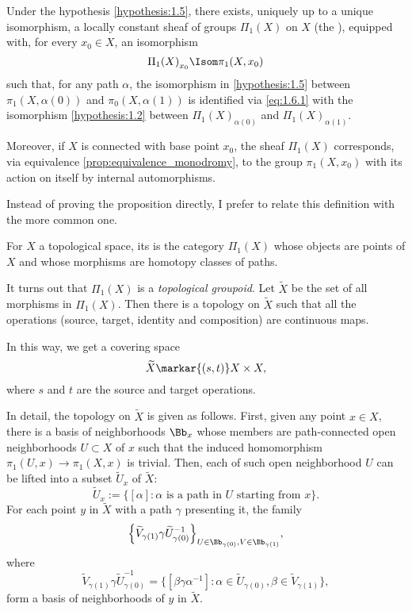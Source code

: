 \begin{proposition}\label{prop:fundamental_groupoid}
  Under the hypothesis \ref{hypothesis:1.5}, there exists,
  uniquely up to a unique isomorphism, a locally constant sheaf of groups
  $\Pi_1(X)$ on $X$ (the ), equipped with,
  for every $x_0\in X$, an isomorphism
  \begin{equation}\label{eq:1.6.1}
    {\Pi_1(X)}_{x_0}\Isom\pi_1(X,x_0)
  \end{equation}
  such that, for any path $\alpha$,
  the isomorphism in \ref{hypothesis:1.5}
  between $\pi_1(X,\alpha(0))$ and $\pi_0(X,\alpha(1))$ is
  identified via \cref{eq:1.6.1} with
  the isomorphism \ref{hypothesis:1.2} between
  ${\Pi_1(X)}_{\alpha(0)}$ and ${\Pi_1(X)}_{\alpha(1)}$.

  Moreover, if $X$ is connected with base point $x_0$, the sheaf $\Pi_1(X)$
  corresponds, via equivalence \ref{prop:equivalence_monodromy},
  to the group $\pi_1(X,x_0)$
  with its action on itself by internal automorphisms.
\end{proposition}


Instead of proving the proposition directly, I prefer to relate this definition
with the more common one.

\begin{subpara}
  For $X$ a topological space, its  is the category
  $\Pi_1(X)$ whose objects are points of $X$ and whose morphisms are homotopy
  classes of paths.

  It turns out that $\Pi_1(X)$ is a \emph{topological groupoid}.
  Let $\widetilde{X}$ be the set of all morphisms in $\Pi_1(X)$.
  Then there is a topology on $\widetilde{X}$ such that all the operations
  (source, target, identity and composition) are continuous maps.

  In this way, we get a covering space
  \[
  \widetilde{X}\markar{(s,t)}X\times X,
  \]
  where $s$ and $t$ are the source and target operations.
\end{subpara}
\begin{Remark}
  In detail, the topology on $\widetilde{X}$ is given as follows.
  First, given any point $x\in X$,
  there is a basis of neighborhoods $\Bb_x$ whose members are path-connected
  open neighborhoods $U\subset X$ of $x$ such that the induced homomorphism
  $\pi_1(U,x)\to\pi_1(X,x)$ is trivial. Then, each of such open neighborhood
  $U$ can be lifted into a subset $\widetilde{U}_x$ of $\widetilde{X}$:
  \[
  \widetilde{U}_x:=
  \big\{[\alpha]:\text{$\alpha$ is a path in $U$ starting from $x$}\big\}.
  \]
  For each point $y$ in $\widetilde{X}$ with a path $\gamma$ presenting it,
  the family
  \[
  \Big\{\widetilde{V}_{\gamma(1)}\gamma\widetilde{U}_{\gamma(0)}^{-1}\Big\}
  _{U\in\Bb_{\gamma(0)},V\in\Bb_{\gamma(1)}},
  \]
  where
  \[
  \widetilde{V}_{\gamma(1)}\gamma\widetilde{U}_{\gamma(0)}^{-1}=
  \big\{
  [\beta\gamma\alpha^{-1}]:
  \alpha\in\widetilde{U}_{\gamma(0)},
  \beta\in\widetilde{V}_{\gamma(1)}
  \big\},
  \]
  form a basis of neighborhoods of $y$ in $\widetilde{X}$.
\end{Remark}

